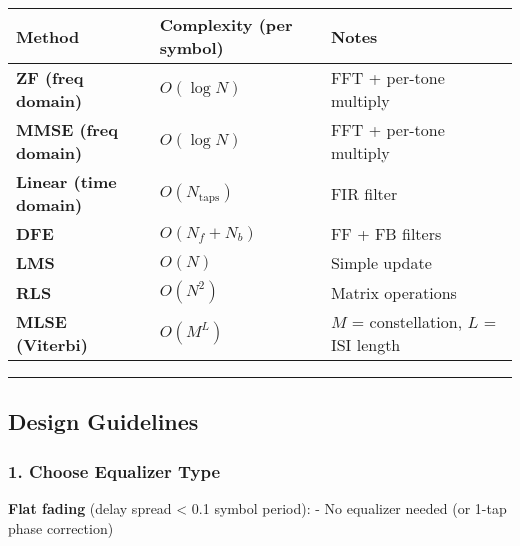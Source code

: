 {\def\LTcaptype{} %
\begin{longtable}[]{@{}
  >{\raggedright\arraybackslash}p{}
  >{\raggedright\arraybackslash}p{}
  >{\raggedright\arraybackslash}p{}@{}}
\toprule\noalign{}
\begin{minipage}[b]{\linewidth}\raggedright
Method
\end{minipage} & \begin{minipage}[b]{\linewidth}\raggedright
Complexity (per symbol)
\end{minipage} & \begin{minipage}[b]{\linewidth}\raggedright
Notes
\end{minipage} \\
\midrule\noalign{}
\endhead
\bottomrule\noalign{}
\endlastfoot
\textbf{ZF (freq domain)} & \(O(\log N)\) & FFT + per-tone multiply \\
\textbf{MMSE (freq domain)} & \(O(\log N)\) & FFT + per-tone multiply \\
\textbf{Linear (time domain)} & \(O(N_{\text{taps}})\) & FIR filter \\
\textbf{DFE} & \(O(N_f + N_b)\) & FF + FB filters \\
\textbf{LMS} & \(O(N)\) & Simple update \\
\textbf{RLS} & \(O(N^2)\) & Matrix operations \\
\textbf{MLSE (Viterbi)} & \(O(M^L)\) & \(M\) = constellation, \(L\) =
ISI length \\
\end{longtable}
}

\begin{center}\rule{0.5\linewidth}{0.5pt}\end{center}

\subsection{Design Guidelines}\label{design-guidelines}

\subsubsection{1. Choose Equalizer Type}\label{choose-equalizer-type}

\textbf{Flat fading} (delay spread \textless{} 0.1 symbol period): - No
equalizer needed (or 1-tap phase correction)

